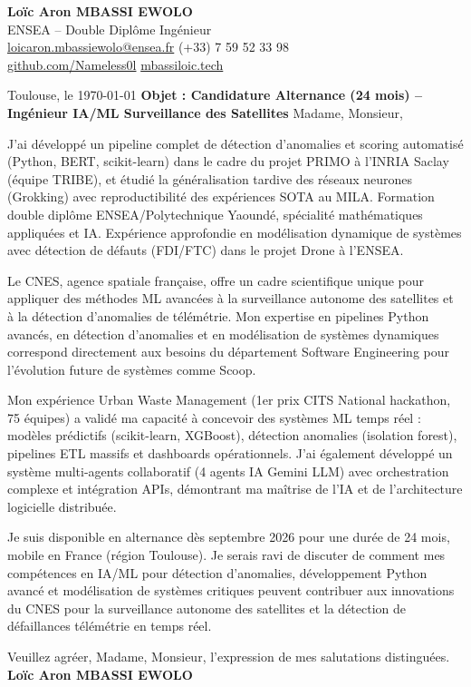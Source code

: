 \documentclass[a4paper,11pt]{article}
\begin{document}
\noindent \textbf{Lo\"ic Aron MBASSI EWOLO} \\
ENSEA -- Double Dipl\^ome Ing\'enieur \\
\href{mailto:loicaron.mbassiewolo@ensea.fr}{loicaron.mbassiewolo@ensea.fr} \quad (+33) 7 59 52 33 98 \\
\href{https://github.com/Nameless0l}{github.com/Nameless0l} \quad \href{https://mbassiloic.tech}{mbassiloic.tech}

\vspace{1em}\noindent Toulouse, le \today
\vspace{1em}\noindent \textbf{Objet : Candidature Alternance (24 mois) -- Ing\'enieur IA/ML Surveillance des Satellites}
\vspace{1.5em}\noindent Madame, Monsieur,

\vspace{0.8em}\noindent J'ai d\'evelopp\'e un pipeline complet de d\'etection d'anomalies et scoring automatisé (Python, BERT, scikit-learn) dans le cadre du projet PRIMO à l'INRIA Saclay (équipe TRIBE), et étudié la généralisation tardive des réseaux neurones (Grokking) avec reproductibilité des expériences SOTA au MILA. Formation double diplôme ENSEA/Polytechnique Yaoundé, spécialité mathématiques appliquées et IA. Expérience approfondie en modélisation dynamique de systèmes avec détection de défauts (FDI/FTC) dans le projet Drone à l'ENSEA.

\vspace{0.8em}\noindent Le CNES, agence spatiale française, offre un cadre scientifique unique pour appliquer des méthodes ML avancées à la surveillance autonome des satellites et à la détection d'anomalies de télémétrie. Mon expertise en pipelines Python avanc\'es, en détection d'anomalies et en modélisation de systèmes dynamiques correspond directement aux besoins du département Software Engineering pour l'évolution future de systèmes comme Scoop.

\vspace{0.8em}\noindent Mon expérience Urban Waste Management (1er prix CITS National hackathon, 75 équipes) a validé ma capacité à concevoir des systèmes ML temps réel : modèles prédictifs (scikit-learn, XGBoost), détection anomalies (isolation forest), pipelines ETL massifs et dashboards opérationnels. J'ai également développé un système multi-agents collaboratif (4 agents IA Gemini LLM) avec orchestration complexe et intégration APIs, démontrant ma maîtrise de l'IA et de l'architecture logicielle distribuée.

\vspace{0.8em}\noindent Je suis disponible en alternance dès septembre 2026 pour une durée de 24 mois, mobile en France (région Toulouse). Je serais ravi de discuter de comment mes compétences en IA/ML pour détection d'anomalies, développement Python avancé et modélisation de systèmes critiques peuvent contribuer aux innovations du CNES pour la surveillance autonome des satellites et la détection de défaillances télémétrie en temps réel.

\vspace{1.5em}\noindent Veuillez agr\'eer, Madame, Monsieur, l'expression de mes salutations distingu\'ees.
\vspace{2em}\noindent \textbf{Lo\"ic Aron MBASSI EWOLO}
\end{document}
